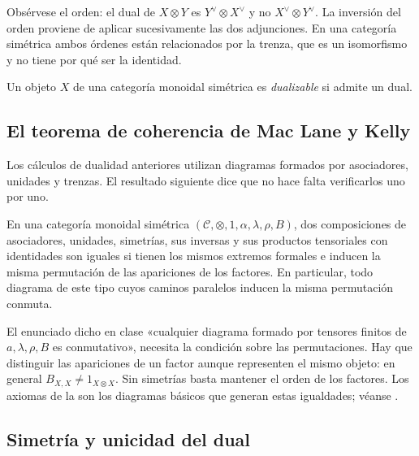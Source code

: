 Obsérvese el orden: el dual de $X\otimes Y$ es $Y^\vee\otimes X^\vee$ y no $X^\vee\otimes Y^\vee$. La inversión del orden proviene de aplicar sucesivamente las dos adjunciones. En una categoría simétrica ambos órdenes están relacionados por la trenza, que es un isomorfismo y no tiene por qué ser la identidad.

\begin{defi}\label{defi:dualizable}
Un objeto $X$ de una categoría monoidal simétrica es \emph{dualizable} si admite un dual.
\end{defi}

\subsection{El teorema de coherencia de Mac Lane y Kelly}

Los cálculos de dualidad anteriores utilizan diagramas formados por asociadores, unidades y trenzas. El resultado siguiente dice que no hace falta verificarlos uno por uno.

\begin{teo}\label{teo:mackane-kelly}
En una categoría monoidal simétrica $(\mathcal C,\otimes,1,\alpha,\lambda,\rho,B)$, dos composiciones de asociadores, unidades, simetrías, sus inversas y sus productos tensoriales con identidades son iguales si tienen los mismos extremos formales e inducen la misma permutación de las apariciones de los factores. En particular, todo diagrama de este tipo cuyos caminos paralelos inducen la misma permutación conmuta.
\end{teo}

\begin{nota}
El enunciado dicho en clase «cualquier diagrama formado por tensores finitos de $a,\lambda,\rho,B$ es conmutativo», necesita la condición sobre las permutaciones. Hay que distinguir las apariciones de un factor aunque representen el mismo objeto: en general $B_{X,X}\ne1_{X\otimes X}$. Sin simetrías basta mantener el orden de los factores. Los axiomas de la  son los diagramas básicos que generan estas igualdades; véanse \cite{maclane1998,kelly1964}.
\end{nota}

\subsection{Simetría y unicidad del dual}

